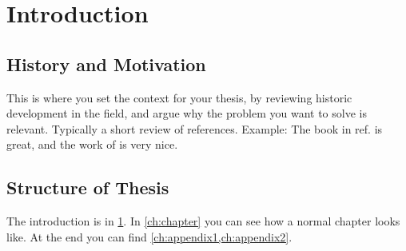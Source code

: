 \chapter{Introduction}\label{ch:introduction}


\section{History and Motivation}

This is where you set the context for your thesis, by reviewing historic development in the field, and argue why the problem you want to solve is relevant.
Typically a short review of references. Example: The book in ref. \cite{altland2010condensed} is great, and the work of \citet{Thouless1982,Tomonaga1950} is very nice.

\section{Structure of Thesis}

The introduction is in \cref{ch:introduction}. In \cref{ch:chapter} you can see how a normal chapter looks like.
At the end you can find \cref{ch:appendix1,ch:appendix2}.

